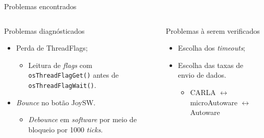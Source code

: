 \documentclass{if-beamer}
\begin{document}
\begin{frame}{Problemas encontrados}
	
	\begin{columns}
		
		\begin{column}{0.5\textwidth}
			
			\begin{block}{Problemas diagnósticados}
				
				\begin{itemize}
					\item Perda de ThreadFlags;
					\begin{itemize}
						\item Leitura de \textit{flags} com \texttt{osThreadFlagGet()} antes de \texttt{osThreadFlagWait()}.
						
					\end{itemize}
					\item \textit{Bounce} no botão JoySW.
					\begin{itemize}
						\item \textit{Debounce} em \textit{software} por meio de bloqueio por 1000 \textit{ticks}.
						
					\end{itemize}
					
				\end{itemize}
				
			\end{block}
			
		\end{column}
		
		\begin{column}{0.5\textwidth}
			
			\begin{block}{Problemas à serem verificados}
				
				\begin{itemize}
					\item Escolha dos \textit{timeouts};
					\item Escolha das taxas de envio de dados.
					\begin{itemize}
						\item CARLA $\leftrightarrow$ microAutoware $\leftrightarrow$ Autoware
						
					\end{itemize}
					
				\end{itemize}
				
			\end{block}
			
		\end{column}
		
	\end{columns}
	
\end{frame}
\end{document}
